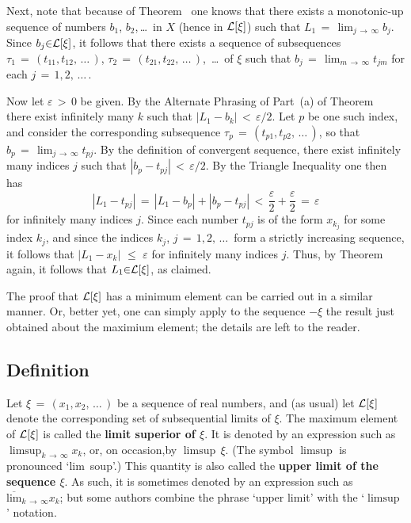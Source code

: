 {    Next, note that because of Theorem~ one knows that there exists a monotonic-up sequence of numbers $b_{1}$, $b_{2}$,\,{\ldots}\, in $X$
    (hence in ${\cal L}[{\xi}]$) such that $L_{1} \,=\, \lim_{j \,{\rightarrow}\, {\infty}} b_{j}$.
    Since $b_{j}{\in}{\cal L}[{\xi}]$, it follows that there exists a sequence of subsequences ${\tau}_{1} \,=\, (t_{11},t_{12},\,{\ldots}\,)$, ${\tau}_{2} \,=\, (t_{21},t_{22},\,{\ldots}\,)$, \,{\ldots}\, of ${\xi}$ such that $b_{j} \,=\, \lim_{m \,{\rightarrow}\, {\infty}} t_{jm}$ for each $j \,=\, 1,2,\,{\ldots}\,$.

        Now let ${\varepsilon}\,>\,0$ be given. By the Alternate Phrasing of Part~(a) of Theorem~ there exist infinitely many $k$ such that $|L_{1}-b_{k}|\,<\,{\varepsilon}/2$.
    Let $p$ be one such index, and consider the corresponding subsequence ${\tau}_{p} \,=\, (t_{p1},t_{p2},\,{\ldots}\,)$, so that $b_{p} \,=\, \lim_{j \,{\rightarrow}\, {\infty}} t_{pj}$.
    By the definition of convergent sequence, there exist infinitely many indices $j$ such that $|b_{p}-t_{pj}|\,<\,{\varepsilon}/2$.
    By the Triangle Inequality one then has
        \begin{displaymath}
        |L_{1}-t_{pj}| \,=\, |L_{1}-b_{p}| + |b_{p}-t_{pj}|\,<\,\frac{{\varepsilon}}{2} + \frac{{\varepsilon}}{2} \,=\, {\varepsilon}
        \end{displaymath}
    for infinitely many indices $j$.
    Since each number $t_{pj}$ is of the form $x_{k_{j}}$ for some index $k_{j}$, and since the indices $k_{j}$, $j \,=\, 1,2,\,{\ldots}\,$ form a strictly increasing sequence, it follows that $|L_{1}-x_{k}|\,\,{\leq}\,\,{\varepsilon}$ for infinitely many indices $j$.
    Thus, by Theorem~ again, it follows that $L_{1}{\in}{\cal L}[{\xi}]$, as claimed. 

        
        The proof that ${\cal L}[{\xi}]$ has a minimum element can be carried out in a similar manner.
    Or, better yet, one can simply apply to the sequence $-{\xi}$ the result just obtained about the maximium element; the details are left to the reader.
        
\V
\V


            \subsection{\small{\bf Definition}}
            \label{DefC50.150}


        Let ${\xi} \,=\, (x_{1},x_{2},\,{\ldots}\,)$ be a sequence of real numbers, and (as usual) let ${\cal L}[{\xi}]$ denote the corresponding set of subsequential limits of ${\xi}$.
    The maximum element of ${\cal L}[{\xi}]$ is called the {\bf limit superior of ${\xi}$}.
    It is denoted by an expression such as ${\displaystyle \limsup_{k \,{\rightarrow}\, {\infty}} x_{k}}$, or, on occasion,by $\limsup\,{\xi}$.
    (The symbol $\limsup$ is pronounced `lim~soup'.)
    This quantity is also called the {\bf upper limit of the sequence ${\xi}$}. As such, it is sometimes denoted by an expression such as $\overline{\mbox{lim}}_{k \,{\rightarrow}\, {\infty}} x_{k}$;
    but some authors combine the phrase `upper limit' with the `$\limsup$' notation.

}
